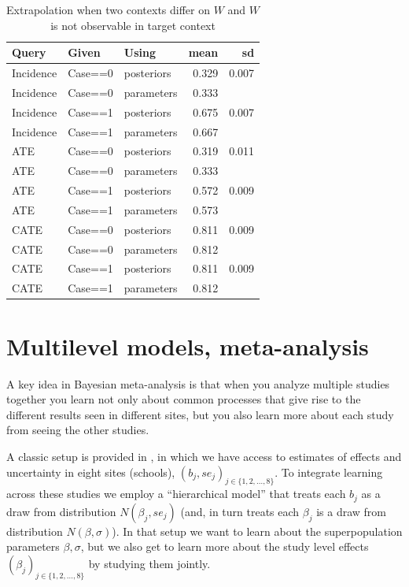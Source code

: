 \documentclass[
  12pt,
]{book}
\begin{document}
\begin{table}

\caption{\label{tab:appev4}Extrapolation when two contexts differ on $W$ and $W$ is not observable in target context}
\centering
\begin{tabular}[t]{l|l|l|r|r}
\hline
Query & Given & Using & mean & sd\\
\hline
Incidence & Case==0 & posteriors & 0.329 & 0.007\\
\hline
Incidence & Case==0 & parameters & 0.333 & \\
\hline
Incidence & Case==1 & posteriors & 0.675 & 0.007\\
\hline
Incidence & Case==1 & parameters & 0.667 & \\
\hline
ATE & Case==0 & posteriors & 0.319 & 0.011\\
\hline
ATE & Case==0 & parameters & 0.333 & \\
\hline
ATE & Case==1 & posteriors & 0.572 & 0.009\\
\hline
ATE & Case==1 & parameters & 0.573 & \\
\hline
CATE & Case==0 & posteriors & 0.811 & 0.009\\
\hline
CATE & Case==0 & parameters & 0.812 & \\
\hline
CATE & Case==1 & posteriors & 0.811 & 0.009\\
\hline
CATE & Case==1 & parameters & 0.812 & \\
\hline
\end{tabular}
\end{table}

\hypertarget{multilevel-models-meta-analysis}{%
\section{Multilevel models, meta-analysis}\label{multilevel-models-meta-analysis}}

A key idea in Bayesian meta-analysis is that when you analyze multiple studies together you learn not only about common processes that give rise to the different results seen in different sites, but you also learn more about each study from seeing the other studies.

A classic setup is provided in \citet{gelman2013bayesian}, in which we have access to estimates of effects and uncertainty in eight sites (schools), \((b_j, se_j)_{j \in \{1,2,\dots,8\}}\). To integrate learning across these studies we employ a ``hierarchical model''
that treats each \(b_j\) as a draw from distribution \(N(\beta_j, se_j)\) (and, in turn treats each \(\beta_j\) is a draw from distribution \(N(\beta, \sigma)\)). In that setup we want to learn about the superpopulation parameters \(\beta, \sigma\), but we also get to learn more about the study level effects \((\beta_j)_{j \in \{1,2,\dots,8\}}\) by studying them jointly.
\end{document}
